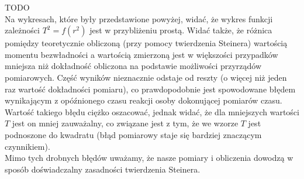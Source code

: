 \documentclass[10pt,a4paper]{article}
\newcommand{\forceindent}{\leavevmode{\parindent=3em\indent}}
\begin{document}
TODO\\
\forceindent Na wykresach, które były przedstawione powyżej, widać, że wykres funkcji zależności $T^2 = f(r^2)$ jest w przybliżeniu prostą.
Widać także, że różnica pomiędzy teoretycznie obliczoną (przy pomocy twierdzenia Steinera) wartością momentu bezwładności a wartością zmierzoną jest w większości przypadków mniejsza niż dokładność obliczona na podstawie możliwości przyrządów pomiarowych. Część wyników nieznacznie odstaje od reszty (o więcej niż jeden raz wartość dokładności pomiaru), co prawdopodobnie jest spowodowane błędem wynikającym z opóźnionego czasu reakcji osoby dokonującej pomiarów czasu. Wartość takiego błędu ciężko oszacować, jednak widać, że dla mniejszych wartości $T$ jest on mniej zauważalny, co związane jest z tym, że we wzorze $T$ jest podnoszone do kwadratu (błąd pomiarowy staje się bardziej znaczącym czynnikiem).\\
Mimo tych drobnych błędów uważamy, że nasze pomiary i obliczenia dowodzą w sposób doświadczalny zasadności twierdzenia Steinera.
\end{document}
